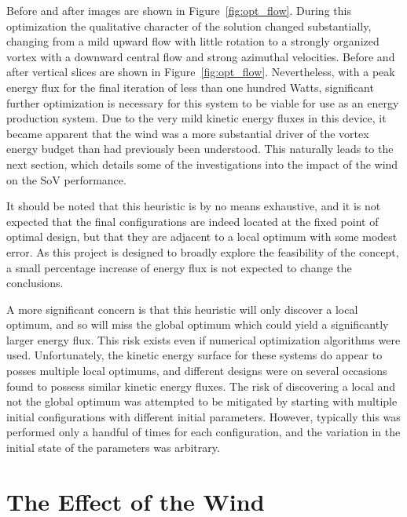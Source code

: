 

Before and after images are shown in
Figure~\ref{fig:opt_flow}. During this optimization 
the qualitative character of the solution changed substantially,
changing from a mild upward flow with little rotation to a strongly
organized vortex with a downward central flow and strong azimuthal 
velocities. Before and after vertical slices are shown in
Figure~\ref{fig:opt_flow}. Nevertheless, with a peak energy flux for the
final iteration of less than one hundred Watts, significant further 
optimization is necessary for this system to be viable for use as an 
energy production system. Due to the very mild kinetic energy fluxes in
this device, it became apparent that the wind was a more substantial
driver of the vortex energy budget than had previously been understood. 
This naturally leads to the next section, which details some of the
investigations into the impact of the wind on the SoV performance. 

It should be noted that this heuristic is by no means exhaustive, and it
is not expected that the final configurations are indeed located at the
fixed point of optimal design, but that they are adjacent to a local
optimum with some modest error. As this project is designed to broadly
explore the feasibility of the concept, a small percentage increase of
energy flux is not expected to change the conclusions. 

A more significant concern is that this heuristic will only discover a
local optimum, and so will miss the global optimum which could yield a
significantly larger energy flux. This risk exists even if
numerical optimization algorithms were used. Unfortunately, the kinetic
energy surface for these systems do appear to posses multiple local
optimums, and different designs were on several occasions found to possess
similar kinetic energy fluxes. The risk of discovering a local 
and not the global optimum was attempted to be mitigated by starting
with multiple initial configurations with different initial
parameters. However, typically this was performed only a handful of
times for each configuration, and the variation in the initial state of
the parameters was arbitrary. 


\section{The Effect of the Wind}
\label{sec:wind_impact}

